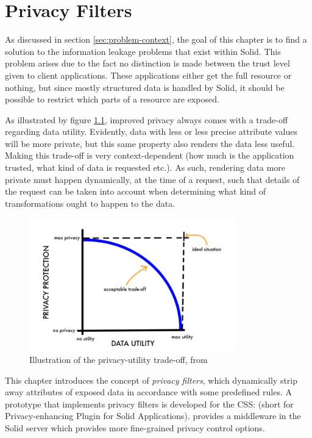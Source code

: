 \chapter{Privacy Filters}
\label{cha:privacy-filters}
As discussed in section \ref{sec:problem-context}, the goal of this chapter is to find a solution to the information leakage problems that exist within Solid. This problem arises due to the fact no distinction is made between the trust level given to client applications. These applications either get the full resource or nothing, but since mostly structured data is handled by Solid, it should be possible to restrict which parts of a resource are exposed.

As illustrated by figure \ref{fig:privacy-utility-tradeoff}, improved privacy always comes with a trade-off regarding data utility. Evidently, data with less or less precise attribute values will be more private, but this same property also renders the data less useful. Making this trade-off is very context-dependent (how much is the application trusted, what kind of data is requested etc.). As such, rendering data more private must happen dynamically, at the time of a request, such that details of the request can be taken into account when determining what kind of transformations ought to happen to the data.

\begin{figure}[h]
    \centering
    \includegraphics[width=0.8\textwidth]{images/Data-Privacy-Protection-versus-Data-Utility.png}
    \caption{Illustration of the privacy-utility trade-off, from \citet{datasharing-implications}}
    \label{fig:privacy-utility-tradeoff}
\end{figure}

\noindent This chapter introduces the concept of \textit{privacy filters}, which dynamically strip away attributes of exposed data in accordance with some predefined rules. A prototype that implements privacy filters is developed for the \gls{CSS}: \middleware{} (short for Privacy-enhancing Plugin for Solid Applications). \middleware{} provides a middleware in the Solid server which provides more fine-grained privacy control options. 


